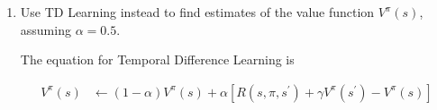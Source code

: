 \documentclass[12pt]{article}
\begin{document}
\begin{enumerate}
\begin{enumerate}
  \item Use TD Learning instead to find estimates of the value
    function $V^{\pi}(s)$, assuming $\alpha=0.5$.

    The equation for Temporal Difference Learning is

    \begin{align*}
      V^{\pi}(s) &\leftarrow (1 - \alpha)V^{\pi}(s) + \alpha\left[R(s,\pi,s^{\prime}) + \gamma V^{\pi}(s^{\prime}) - V^{\pi}(s)\right]
    \end{align*}

  \end{enumerate}

\end{enumerate}
\end{document}

